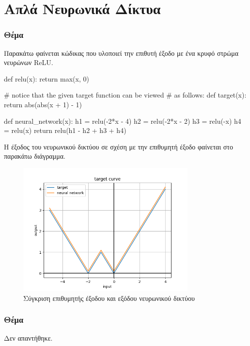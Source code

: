 \documentclass{article}
\newcommand{\eng}[1]{\foreignlanguage{english}{#1}} %
\begin{document}
\clearpage
\part{Απλά Νευρωνικά Δίκτυα}
\section{Θέμα}

Παρακάτω φαίνεται κώδικας που υλοποιεί την επιθυτή έξοδο με ένα κρυφό στρώμα
νευρώνων \eng{ReLU}.

\begin{python}
def relu(x):
    return max(x, 0)

# notice that the given target function can be viewed
# as follows:
def target(x):
    return abs(abs(x + 1) - 1)

def neural_network(x):
    h1 = relu(-2*x - 4)
    h2 = relu(-2*x - 2)
    h3 = relu(-x)
    h4 = relu(x)
    return relu(h1 - h2 + h3 + h4)
\end{python}

Η έξοδος του νευρωνικού δικτύου σε σχέση με την επιθυμητή έξοδο φαίνεται στο
παρακάτω διάγραμμα.

\begin{figure}[h]
    \centering
    \includegraphics[width=0.8\textwidth]{part2/target-curve.png}
    \caption{Σύγκριση επιθυμητής έξοδου και εξόδου νευρωνικού δικτύου}
\end{figure}
\clearpage
\section{Θέμα}

Δεν απαντήθηκε.
\end{document}
